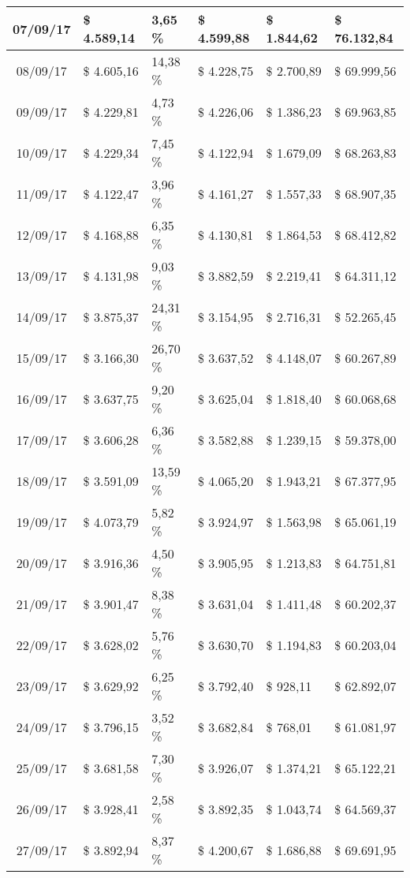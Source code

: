 \begin{small}
\begin{longtable}{|c|l|l|l|l|l|}
07/09/17 & \$ 4.589,14 & 3,65 \% & \$ 4.599,88 & \$ 1.844,62 & \$ 76.132,84 \\ \hline
08/09/17 & \$ 4.605,16 & 14,38 \% & \$ 4.228,75 & \$ 2.700,89 & \$ 69.999,56 \\ \hline
09/09/17 & \$ 4.229,81 & 4,73 \% & \$ 4.226,06 & \$ 1.386,23 & \$ 69.963,85 \\ \hline
10/09/17 & \$ 4.229,34 & 7,45 \% & \$ 4.122,94 & \$ 1.679,09 & \$ 68.263,83 \\ \hline
11/09/17 & \$ 4.122,47 & 3,96 \% & \$ 4.161,27 & \$ 1.557,33 & \$ 68.907,35 \\ \hline
12/09/17 & \$ 4.168,88 & 6,35 \% & \$ 4.130,81 & \$ 1.864,53 & \$ 68.412,82 \\ \hline
13/09/17 & \$ 4.131,98 & 9,03 \% & \$ 3.882,59 & \$ 2.219,41 & \$ 64.311,12 \\ \hline
14/09/17 & \$ 3.875,37 & 24,31 \% & \$ 3.154,95 & \$ 2.716,31 & \$ 52.265,45 \\ \hline
15/09/17 & \$ 3.166,30 & 26,70 \% & \$ 3.637,52 & \$ 4.148,07 & \$ 60.267,89 \\ \hline
16/09/17 & \$ 3.637,75 & 9,20 \% & \$ 3.625,04 & \$ 1.818,40 & \$ 60.068,68 \\ \hline
17/09/17 & \$ 3.606,28 & 6,36 \% & \$ 3.582,88 & \$ 1.239,15 & \$ 59.378,00 \\ \hline
18/09/17 & \$ 3.591,09 & 13,59 \% & \$ 4.065,20 & \$ 1.943,21 & \$ 67.377,95 \\ \hline
19/09/17 & \$ 4.073,79 & 5,82 \% & \$ 3.924,97 & \$ 1.563,98 & \$ 65.061,19 \\ \hline
20/09/17 & \$ 3.916,36 & 4,50 \% & \$ 3.905,95 & \$ 1.213,83 & \$ 64.751,81 \\ \hline
21/09/17 & \$ 3.901,47 & 8,38 \% & \$ 3.631,04 & \$ 1.411,48 & \$ 60.202,37 \\ \hline
22/09/17 & \$ 3.628,02 & 5,76 \% & \$ 3.630,70 & \$ 1.194,83 & \$ 60.203,04 \\ \hline
23/09/17 & \$ 3.629,92 & 6,25 \% & \$ 3.792,40 & \$ 928,11 & \$ 62.892,07 \\ \hline
24/09/17 & \$ 3.796,15 & 3,52 \% & \$ 3.682,84 & \$ 768,01 & \$ 61.081,97 \\ \hline
25/09/17 & \$ 3.681,58 & 7,30 \% & \$ 3.926,07 & \$ 1.374,21 & \$ 65.122,21 \\ \hline
26/09/17 & \$ 3.928,41 & 2,58 \% & \$ 3.892,35 & \$ 1.043,74 & \$ 64.569,37 \\ \hline
27/09/17 & \$ 3.892,94 & 8,37 \% & \$ 4.200,67 & \$ 1.686,88 & \$ 69.691,95 \\ \hline

\end{longtable}
\end{small}

